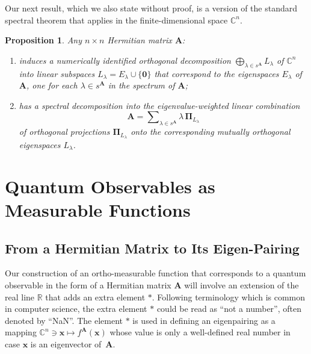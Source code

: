 \documentclass[11pt]{article}
\newcommand \R { \mathbb{R} }
\newcommand \C { \mathbb{C} }
\newtheorem{proposition}[theorem]{Proposition}
\begin{document}
Our next result, which we also state without proof, 
is a version of the standard spectral theorem 
that applies in the finite-dimensional space $ \C^n $.

\begin{proposition} \label{prop:spectralThm}
	Any $n \times n$ Hermitian matrix $ \mathbf A$:
\begin{enumerate}
	\item induces a numerically identified orthogonal decomposition 
 \( \bigoplus\nolimits _{ \lambda \in s^{ \mathbf A} } L_\lambda \) of $ \C^n $
	into linear subspaces $ L_\lambda = E_\lambda \cup \{ \mathbf 0\} $
	that correspond to the eigenspaces $ E_\lambda $ of $ \mathbf A$,
	one for each $ \lambda \in s^{ \mathbf A} $ in the spectrum of $ \mathbf A$;
	\item has a \emph{spectral decomposition} into the eigenvalue-weighted linear combination 
\begin{equation} \label{eq:spectralDecomp}
	\mathbf A = \sum\nolimits _{ \lambda \in s^{ \mathbf A} } 
	\lambda \, \boldsymbol \Pi _{ L_\lambda }
\end{equation}
	of orthogonal projections $ \boldsymbol \Pi _{ L_\lambda }$ 
	onto the corresponding mutually orthogonal eigenspaces $ L_\lambda $.
\end{enumerate}
\end{proposition}

\section{Quantum Observables as Measurable Functions} \label{s:firstBijection}
\subsection{From a Hermitian Matrix to Its Eigen-Pairing}

Our construction of an ortho-measurable function 
that corresponds to a quantum observable in the form of a Hermitian matrix $ \mathbf A$
will involve an extension of the real line $\R$ that adds an extra element $*$.
Following terminology which is common in computer science,
the extra element $*$ could be read as ``not a number'', often denoted by ``NaN''.
The element $*$ is used in defining an eigenpairing 
as a mapping  \( \C^n \owns \mathbf x \mapsto f^{ \mathbf A} ( \mathbf x) \) 
whose value is only a well-defined real number 
in case $ \mathbf x$ is an eigenvector of~$ \mathbf A$.
\end{document}

